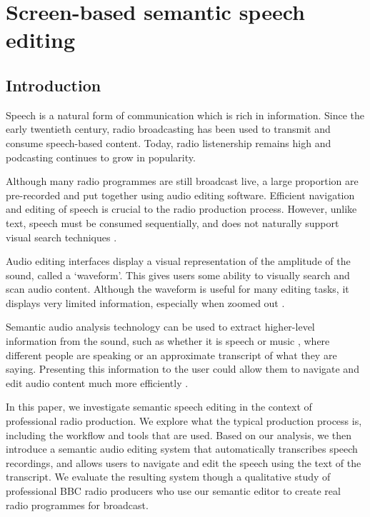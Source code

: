 \chapter{Screen-based semantic speech editing}\label{chp:screen-based}

\section{Introduction}
Speech is a natural form of communication which is rich in information. Since
the early twentieth century, radio broadcasting has been used to transmit and
consume speech-based content. Today, radio listenership remains high and
podcasting continues to grow in popularity. 

Although many radio programmes are still broadcast live, a large proportion are
pre-recorded and put together using audio editing software. Efficient
navigation and editing of speech is crucial to the radio production process.
However, unlike text, speech must be consumed sequentially, and does not
naturally support visual search techniques \citep{Wolfe2004}. 

Audio editing interfaces display a visual representation of the amplitude of
the sound, called a `waveform'. This gives users some ability to visually
search and scan audio content. Although the waveform is useful for many editing
tasks, it displays very limited information, especially when zoomed out
\citep{Loviscach2011}.

Semantic audio analysis technology can be used to extract higher-level
information from the sound, such as whether it is speech or music
\citep{Panagiotakis2005}, where different people are speaking
\citep{AngueraMiro2012} or an approximate transcript of what they are saying.
Presenting this information to the user could allow them to navigate and edit
audio content much more efficiently \citep{Whittaker2004}.

In this paper, we investigate semantic speech editing in the context of
professional radio production. We explore what the typical production process
is, including the workflow and tools that are used. Based on our
analysis, we then introduce a semantic audio editing system that automatically
transcribes speech recordings, and allows users to navigate and edit the speech
using the text of the transcript.  We evaluate the resulting system though a
qualitative study of professional BBC radio producers who use our semantic
editor to create real radio programmes for broadcast.

